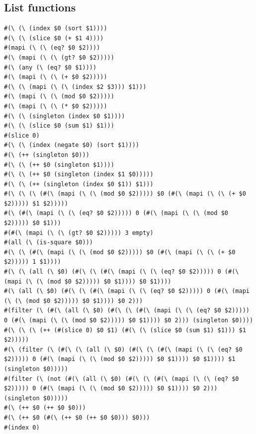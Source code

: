 \documentclass{article}
\begin{document}
\subsection{List functions}
\begin{lstlisting}
#(\ (\ (index $0 (sort $1))))
#(\ (\ (slice $0 (+ $1 4))))
#(mapi (\ (\ (eq? $0 $2))))
#(\ (mapi (\ (\ (gt? $0 $2)))))
#(\ (any (\ (eq? $0 $1))))
#(\ (mapi (\ (\ (+ $0 $2)))))
#(\ (\ (mapi (\ (\ (index $2 $3))) $1)))
#(\ (mapi (\ (\ (mod $0 $2)))))
#(\ (mapi (\ (\ (* $0 $2)))))
#(\ (\ (singleton (index $0 $1))))
#(\ (\ (slice $0 (sum $1) $1)))
#(slice 0)
#(\ (\ (index (negate $0) (sort $1))))
#(\ (++ (singleton $0)))
#(\ (\ (++ $0 (singleton $1))))
#(\ (\ (++ $0 (singleton (index $1 $0)))))
#(\ (\ (++ (singleton (index $0 $1)) $1)))
#(\ (\ (\ (#(\ (mapi (\ (\ (mod $0 $2))))) $0 (#(\ (mapi (\ (\ (+ $0 $2))))) $1 $2)))))
#(\ (#(\ (mapi (\ (\ (eq? $0 $2))))) 0 (#(\ (mapi (\ (\ (mod $0 $2))))) $0 $1)))
#(#(\ (mapi (\ (\ (gt? $0 $2))))) 3 empty)
#(all (\ (is-square $0)))
#(\ (\ (#(\ (mapi (\ (\ (mod $0 $2))))) $0 (#(\ (mapi (\ (\ (+ $0 $2))))) 1 $1))))
#(\ (\ (all (\ $0) (#(\ (\ (#(\ (mapi (\ (\ (eq? $0 $2))))) 0 (#(\ (mapi (\ (\ (mod $0 $2))))) $0 $1)))) $0 $1))))
#(\ (all (\ $0) (#(\ (\ (#(\ (mapi (\ (\ (eq? $0 $2))))) 0 (#(\ (mapi (\ (\ (mod $0 $2))))) $0 $1)))) $0 2)))
#(filter (\ (#(\ (all (\ $0) (#(\ (\ (#(\ (mapi (\ (\ (eq? $0 $2))))) 0 (#(\ (mapi (\ (\ (mod $0 $2))))) $0 $1)))) $0 2))) (singleton $0))))
#(\ (\ (\ (++ (#(slice 0) $0 $1) (#(\ (\ (slice $0 (sum $1) $1))) $1 $2)))))
#(\ (filter (\ (#(\ (\ (all (\ $0) (#(\ (\ (#(\ (mapi (\ (\ (eq? $0 $2))))) 0 (#(\ (mapi (\ (\ (mod $0 $2))))) $0 $1)))) $0 $1)))) $1 (singleton $0)))))
#(filter (\ (not (#(\ (all (\ $0) (#(\ (\ (#(\ (mapi (\ (\ (eq? $0 $2))))) 0 (#(\ (mapi (\ (\ (mod $0 $2))))) $0 $1)))) $0 2))) (singleton $0)))))
#(\ (++ $0 (++ $0 $0)))
#(\ (++ $0 (#(\ (++ $0 (++ $0 $0))) $0)))
#(index 0)
\end{lstlisting}



\end{document}
